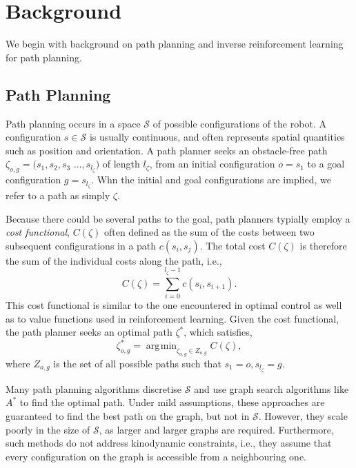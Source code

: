 \documentclass{article}  %
\DeclareMathOperator*{\argmin}{\arg\!\min}
\begin{document}
\section{Background}
We begin with background on path planning and inverse reinforcement learning for path planning.

\subsection{Path Planning \label{subsec:path_planning}}
Path planning occurs in a space $\mathcal{S}$ of possible configurations of the robot. A configuration $s \in \mathcal{S}$ is usually continuous, and often represents spatial quantities such as position and orientation. A path planner seeks an obstacle-free path $\zeta_{o,g} = (s_1,s_2,s_3$ $\ldots,s_{l_{\zeta}}) $ of length $l_{\zeta}$, from an initial configuration $o = s_1$ to a goal configuration  $g =s_{l_{\zeta}}$. Whn the initial and goal configurations are implied, we refer to a path as simply $\zeta$.

Because there could be several paths to the goal, path planners typially employ a \emph{cost functional}, $C(\zeta)$ often defined as the sum of the costs between two subsequent configurations in a path $c(s_i,s_j)$. The total cost $C(\zeta)$ is therefore the sum of the individual costs along the path, i.e.,
\begin{equation}
	C(\zeta) = \sum_{i=0}^{l_{\zeta}-1} c(s_i,s_{i+1}).
\end{equation}
This cost functional is similar to the one encountered in optimal control as well as to value functions used in reinforcement learning. Given the cost functional, the path planner seeks an optimal path $\zeta^*$, which satisfies,
\begin{equation}
 	\zeta^*_{o,g} = \argmin_{\zeta_{o,g} \in Z_{o,g}} C(\zeta), \label{eq:back_plan}
\end{equation}
where $Z_{o,g}$ is the set of all possible paths such that $s_1 = o, s_{l_\zeta} = g$.

Many path planning algorithms discretise $\mathcal{S}$ and use graph search algorithms like $A^*$ to find the optimal path. Under mild assumptions, these approaches are guaranteed to find the best path on the graph, but not in $\mathcal{S}$. However, they scale poorly in the size of $\mathcal{S}$, as larger and larger graphs are required. Furthermore, such methods do not address kinodynamic constraints, i.e., they assume that every configuration on the graph is accessible from a neighbouring one. 
\end{document}
